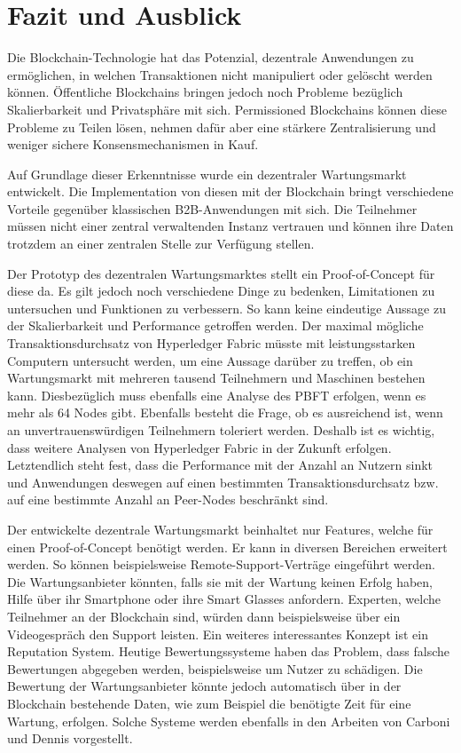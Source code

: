 \chapter{Fazit und Ausblick}
\label{cha:fazit}

Die Blockchain-Technologie hat das Potenzial, dezentrale Anwendungen zu ermöglichen, in welchen Transaktionen nicht manipuliert oder gelöscht werden können. Öffentliche Blockchains bringen jedoch noch Probleme bezüglich Skalierbarkeit und Privatsphäre mit sich. Permissioned Blockchains können diese Probleme zu Teilen lösen, nehmen dafür aber eine stärkere Zentralisierung und weniger sichere Konsensmechanismen in Kauf. 

Auf Grundlage dieser Erkenntnisse wurde ein dezentraler Wartungsmarkt entwickelt. Die Implementation von diesen mit der Blockchain bringt verschiedene Vorteile gegenüber klassischen B2B-Anwendungen mit sich. Die Teilnehmer müssen nicht einer zentral verwaltenden Instanz vertrauen und können ihre Daten trotzdem an einer zentralen Stelle zur Verfügung stellen.

Der Prototyp des dezentralen Wartungsmarktes stellt ein Proof-of-Concept für diese da. Es gilt jedoch noch verschiedene Dinge zu bedenken, Limitationen zu untersuchen und Funktionen zu verbessern. So kann keine eindeutige Aussage zu der Skalierbarkeit und Performance getroffen werden. Der maximal mögliche Transaktionsdurchsatz von Hyperledger Fabric müsste mit leistungsstarken Computern untersucht werden, um eine Aussage darüber zu treffen, ob ein Wartungsmarkt mit mehreren tausend Teilnehmern und Maschinen bestehen kann. Diesbezüglich muss ebenfalls eine Analyse des \acs{PBFT} erfolgen, wenn es mehr als 64 Nodes gibt. Ebenfalls besteht die Frage, ob es ausreichend ist, wenn  an unvertrauenswürdigen Teilnehmern toleriert werden. Deshalb ist es wichtig, dass weitere Analysen von Hyperledger Fabric in der Zukunft erfolgen. Letztendlich steht fest, dass die Performance mit der Anzahl an Nutzern sinkt und Anwendungen deswegen auf einen bestimmten Transaktionsdurchsatz bzw. auf eine bestimmte Anzahl an Peer-Nodes beschränkt sind. 

Der entwickelte dezentrale Wartungsmarkt beinhaltet nur Features, welche für einen Proof-of-Concept benötigt werden. Er kann in diversen Bereichen erweitert werden. So können beispielsweise Remote-Support-Verträge eingeführt werden. Die Wartungsanbieter könnten, falls sie mit der Wartung keinen Erfolg haben, Hilfe über ihr Smartphone oder ihre Smart Glasses anfordern. Experten, welche Teilnehmer an der Blockchain sind, würden dann beispielsweise über ein Videogespräch den Support leisten. Ein weiteres interessantes Konzept ist ein Reputation System. Heutige Bewertungssysteme haben das Problem, dass falsche Bewertungen abgegeben werden, beispielsweise um Nutzer zu schädigen. Die Bewertung der Wartungsanbieter könnte jedoch automatisch über in der Blockchain bestehende Daten, wie zum Beispiel die benötigte Zeit für eine Wartung, erfolgen. Solche Systeme werden ebenfalls in den Arbeiten von Carboni \cite{CarboniFeedbackbasedReputation2015} und Dennis \cite{DennisRepblocknext2015} vorgestellt.

